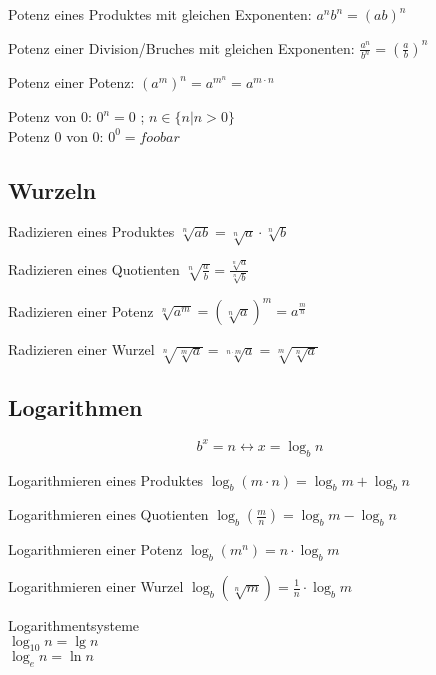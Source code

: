 Potenz eines Produktes mit gleichen Exponenten: $ {a^n}{b^n} = (ab)^{n}$ 

Potenz einer Division/Bruches mit gleichen Exponenten: $ \frac{a^n}{b^n} = (\frac{a}{b}) ^n$ 

Potenz einer Potenz: $ (a^m)^n = a^{m^n} = a^{m \cdot n}$ 

Potenz von 0: $ 0^n = 0 $ ;  $n \in\{n | n > 0\}$\\
Potenz 0 von 0: $ 0^0 = foobar $ 

\subsection{Wurzeln}

Radizieren eines Produktes $\sqrt[n]{ab} = \sqrt[n]{a} \cdot \sqrt[n]{b}$

Radizieren eines Quotienten $\sqrt[n]{\frac{a}{b} } = \frac{\sqrt[n]{a}}{\sqrt[n]{b}} $

Radizieren einer Potenz $\sqrt[n]{ a^m} = (\sqrt[n]{ a})^m = a^{\frac{m}{n}}$

Radizieren einer Wurzel $\sqrt[n]{\sqrt[m]{a}}  = \sqrt[n \cdot m]{a} = \sqrt[m]{\sqrt[n]{a}}$


\subsection{Logarithmen}
$$ b^x =n \longleftrightarrow x = \log_b n$$

Logarithmieren eines Produktes $\log_b (m \cdot n) = \log_b m + \log_b n $ 

Logarithmieren eines Quotienten $\log_b (\frac{m}{n}) = \log_b m - \log_b n  $ 

Logarithmieren einer Potenz $\log_b (m^n) =  n \cdot \log_b m $ 

Logarithmieren einer Wurzel $\log_b (\sqrt[n]{m}) =  \frac{1}{n} \cdot \log_b m $ 

Logarithmentsysteme \\
$\log_{10} n = \lg n $\\
$\log_{e} n = \ln n $

